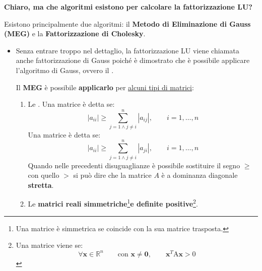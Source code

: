 \begin{flushleft}
    \textcolor{Green3}{ \textbf{Chiaro, ma che algoritmi esistono per calcolare la fattorizzazione LU?}}
\end{flushleft}
Esistono principalmente due algoritmi: il \textbf{Metodo di Eliminazione di Gauss (MEG)} e la \textbf{Fattorizzazione di Cholesky}.
\begin{itemize}
    \item Senza entrare troppo nel dettaglio, la fattorizzazione LU viene chiamata anche fattorizzazione di Gauss poiché è dimostrato che è possibile applicare l'algoritmo di Gauss, ovvero il .

    Il \textbf{MEG} è possibile \textbf{applicarlo} per \underline{alcuni tipi di matrici}:
    \begin{enumerate}
        \item Le . Una matrice è detta  se:
        \begin{equation}
            \left| a_{ii} \right| \ge \displaystyle\sum_{j=1 \land j \ne i}^{n} \left| a_{ij} \right|, \hspace{2em} i = 1, \dots, n
        \end{equation}
        Una matrice è detta  se:
        \begin{equation}
            \left| a_{ii} \right| \ge \displaystyle\sum_{j=1 \land j \ne i}^{n} \left| a_{ji} \right|, \hspace{2em} i = 1, \dots, n
        \end{equation}
        Quando nelle precedenti disuguaglianze è possibile sostituire il segno $\ge$ con quello $>$ si può dire che la matrice $A$ è a dominanza diagonale \textbf{stretta}.

        \item Le \textbf{matrici reali simmetriche}\footnote{Una matrice è simmetrica se coincide con la sua matrice trasposta.}\textbf{e definite positive}\footnote{Una matrice viene  se:
        \begin{equation*}
            \forall \mathbf{x} \in \mathbb{R}^{n} \hspace{2em} \text{con } \mathbf{x} \ne \mathbf{0}, \hspace{2em} \mathbf{x}^{T} \mathrm{A}\mathbf{x} > 0
        \end{equation*}}.
    \end{enumerate}


\end{itemize}
